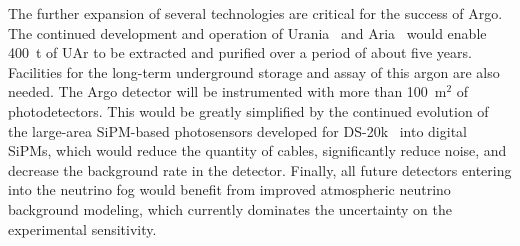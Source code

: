 The further expansion of several technologies are critical for the success of Argo. The continued development and operation of Urania~\cite{Aalseth:2018gq} and Aria~\cite{Agnes:2021us} would enable 400~t of UAr to be extracted and purified over a period of about five years. Facilities for the long-term underground storage and assay of this argon are also needed. The Argo detector will be instrumented with more than 100~m$^2$ of photodetectors. This would be greatly simplified by the continued evolution of the large-area SiPM-based photosensors developed for DS-20k~\cite{DIncecco:2018hy,DIncecco:2018fx} into digital SiPMs, which would reduce the quantity of cables, significantly reduce noise, and decrease the background rate in the detector. Finally, all future detectors entering into the neutrino fog would benefit from improved atmospheric neutrino background modeling, which currently dominates the uncertainty on the experimental sensitivity.
